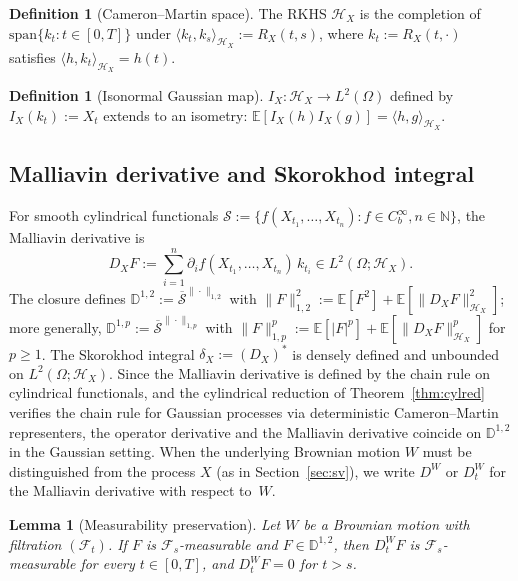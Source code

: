 \documentclass[11pt,a4paper]{article}
\theoremstyle{plain}
\newtheorem{lemma}[theorem]{Lemma}
\theoremstyle{definition}
\newtheorem{definition}[theorem]{Definition}
\theoremstyle{remark}
\newcommand{\E}{\mathbb{E}}
\newcommand{\N}{\mathbb{N}}
\newcommand{\HX}{\mathcal{H}_X}
\begin{document}
\begin{definition}[Cameron--Martin space]\label{def:CM}
The RKHS $\HX$ is the completion of $\mathrm{span}\{k_t : t \in [0,T]\}$ under $\langle k_t, k_s\rangle_{\HX} := R_X(t,s)$, where $k_t := R_X(t,\cdot)$ satisfies $\langle h, k_t\rangle_{\HX} = h(t)$.
\end{definition}

\begin{definition}[Isonormal Gaussian map]\label{def:isonormal}
$I_X : \HX \to L^2(\Omega)$ defined by $I_X(k_t) := X_t$ extends to an isometry: $\E[I_X(h)I_X(g)] = \langle h,g\rangle_{\HX}$.
\end{definition}

\subsection{Malliavin derivative and Skorokhod integral}

For smooth cylindrical functionals $\mathcal{S} := \{f(X_{t_1},\ldots,X_{t_n}) : f \in C_b^\infty, n \in \N\}$, the Malliavin derivative is
\begin{equation}\label{eq:malliavin_deriv}
D_XF := \sum_{i=1}^n \partial_if(X_{t_1},\ldots,X_{t_n})\,k_{t_i} \in L^2(\Omega;\HX).
\end{equation}
The closure defines $\mathbb{D}^{1,2} := \overline{\mathcal{S}}^{\|\cdot\|_{1,2}}$ with $\|F\|_{1,2}^2 := \E[F^2]+\E[\|D_XF\|^2_{\HX}]$; more generally, $\mathbb{D}^{1,p} := \overline{\mathcal{S}}^{\|\cdot\|_{1,p}}$ with $\|F\|_{1,p}^p := \E[|F|^p]+\E[\|D_XF\|^p_{\HX}]$ for $p \ge 1$. The Skorokhod integral $\delta_X := (D_X)^*$ is densely defined and unbounded on $L^2(\Omega;\HX)$. Since the Malliavin derivative is defined by the chain rule on cylindrical functionals, and the cylindrical reduction of Theorem~\ref{thm:cylred} verifies the chain rule for Gaussian processes via deterministic Cameron--Martin representers, the operator derivative and the Malliavin derivative coincide on $\mathbb{D}^{1,2}$ in the Gaussian setting. When the underlying Brownian motion $W$ must be distinguished from the process $X$ (as in Section~\ref{sec:sv}), we write $D^W$ or $D_t^W$ for the Malliavin derivative with respect to~$W$.

\begin{lemma}[Measurability preservation]\label{lem:meas_pres}
Let $W$ be a Brownian motion with filtration $(\mathcal{F}_t)$. If $F$ is $\mathcal{F}_s$-measurable and $F \in \mathbb{D}^{1,2}$, then $D_t^W F$ is $\mathcal{F}_s$-measurable for every $t \in [0,T]$, and $D_t^W F = 0$ for $t > s$.
\end{lemma}
\end{document}
